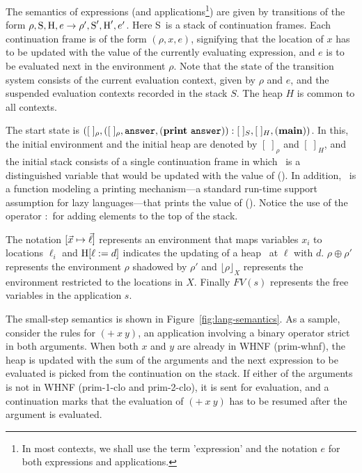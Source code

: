 \documentclass[9pt]{sigplanconf}
\def\myvec{\mathaccent"017E }
\newcommand{\stk}{\mbox{S}}
\begin{document}
The  semantics  of   expressions  (and  applications\footnote{In  most
  contexts, we  shall use the  term 'expression' and the  notation $e$
  for both expressions and applications.}) are given by transitions of
the form $\rho, \stk, \heap,  e \rightarrow \rho', \stk', \heap', e'$.
Here \stk\ is a stack of continuation frames.  Each continuation frame
is of the form $(\rho, x, e)$, signifying that the location of $x$ has
to be updated  with the value of the  currently evaluating expression,
and $e$ is to be evaluated  next in the environment $\rho$.  Note that
the state of the transition  system consists of the current evaluation
context,  given  by  $\rho$  and $e$,  and  the  suspended  evaluation
contexts recorded  in the stack  $S$.  The heap  $H$ is common  to all
contexts.


The     start      state     is      $([\;]_\rho,([\;]_\rho,     \mathbf{\mbox{\tt answer}},
(\mathbf{print}~\mathbf{\mbox{\tt answer}})):[\;]_{S} , [\;]_{H}, (\mathbf{main}))$.  In this, the initial
environment  and  the initial  heap  are  denoted by  $[\;]_\rho$  and
$[\;]_H$,  and the  initial stack  consists of  a single  continuation
frame in which \ans\ is a distinguished variable that would be updated
with  the value  of (\mainpgm).   In addition,  \print\ is  a function
modeling a printing mechanism---a standard run-time support assumption
for lazy  languages---that prints  the value of (\mainpgm).   Notice the
use of the operator $:$ for adding elements to the top of the stack.



The notation  $[\myvec{x}   \mapsto  \myvec{\ell}]$   represents  an
environment that maps variables $x_i$
to locations $\ell_i$
and  $\mbox{H}[\ell :=  d]$
indicates the  updating of  a heap \heap\  at $\ell$ with  $d$.  $\rho
\oplus \rho'$  represents the  environment $\rho$ shadowed  by $\rho'$
and $\lfloor \rho \rfloor_X$  represents the environment restricted to
the locations in $X$. Finally $FV(s)$ represents the free variables in
the application $s$.

The small-step semantics  is shown in Figure~\ref{fig:lang-semantics}.
As  a sample,  consider  the  rules  for  $(+~x~y)$, an  application
involving a binary operator strict in both arguments.   When
both $x$  and $y$ are already  in WHNF ({\sc prim-whnf}),  the heap is
updated with the  sum of the arguments and  the next expression to be
evaluated is picked from the continuation on the stack. If either of the
arguments is not in
WHNF  ({\sc  prim-1-clo}  and   {\sc  prim-2-clo}),  it  is  sent  for
evaluation, and a continuation  marks that the evaluation of $(+~x~y)$
has to be resumed after the argument is evaluated.
\end{document}
